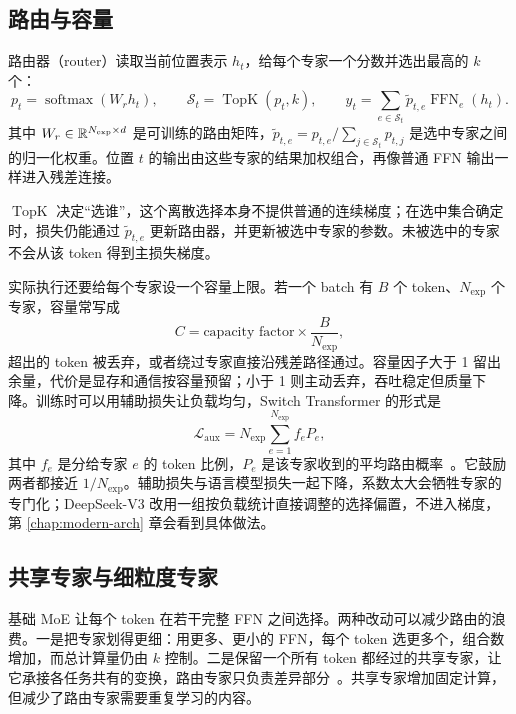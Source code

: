 \subsection{路由与容量}

路由器（router）读取当前位置表示 \(h_t\)，给每个专家一个分数并选出最高的 \(k\) 个：
\begin{equation}
 p_t=\operatorname{softmax}(W_rh_t),\qquad
 \mathcal S_t=\operatorname{TopK}(p_t,k),\qquad
 y_t=\sum_{e\in\mathcal S_t}\widetilde p_{t,e}\operatorname{FFN}_e(h_t).
\end{equation}
其中 \(W_r\in\mathbb{R}^{N_{\mathrm{exp}}\times d}\) 是可训练的路由矩阵，\(\widetilde p_{t,e}=p_{t,e}/\sum_{j\in\mathcal S_t}p_{t,j}\) 是选中专家之间的归一化权重。位置 \(t\) 的输出由这些专家的结果加权组合，再像普通 FFN 输出一样进入残差连接。

\(\operatorname{TopK}\) 决定“选谁”，这个离散选择本身不提供普通的连续梯度；在选中集合确定时，损失仍能通过 \(\widetilde p_{t,e}\) 更新路由器，并更新被选中专家的参数。未被选中的专家不会从该 token 得到主损失梯度。

实际执行还要给每个专家设一个容量上限。若一个 batch 有 \(B\) 个 token、\(N_{\mathrm{exp}}\) 个专家，容量常写成
\begin{equation}
 C=\text{capacity factor}\times\frac{B}{N_{\mathrm{exp}}},
\end{equation}
超出的 token 被丢弃，或者绕过专家直接沿残差路径通过。容量因子大于 1 留出余量，代价是显存和通信按容量预留；小于 1 则主动丢弃，吞吐稳定但质量下降。训练时可以用辅助损失让负载均匀，Switch Transformer 的形式是
\begin{equation}
 \mathcal L_{\mathrm{aux}}=N_{\mathrm{exp}}\sum_{e=1}^{N_{\mathrm{exp}}}f_eP_e,
 \label{eq:moe-aux}
\end{equation}
其中 \(f_e\) 是分给专家 \(e\) 的 token 比例，\(P_e\) 是该专家收到的平均路由概率~\cite{fedus2022switch}。它鼓励两者都接近 \(1/N_{\mathrm{exp}}\)。辅助损失与语言模型损失一起下降，系数太大会牺牲专家的专门化；DeepSeek-V3 改用一组按负载统计直接调整的选择偏置，不进入梯度，第 \ref{chap:modern-arch} 章会看到具体做法。

\subsection{共享专家与细粒度专家}

基础 MoE 让每个 token 在若干完整 FFN 之间选择。两种改动可以减少路由的浪费。一是把专家划得更细：用更多、更小的 FFN，每个 token 选更多个，组合数增加，而总计算量仍由 \(k\) 控制。二是保留一个所有 token 都经过的共享专家，让它承接各任务共有的变换，路由专家只负责差异部分~\cite{deepseekv2}。共享专家增加固定计算，但减少了路由专家需要重复学习的内容。

